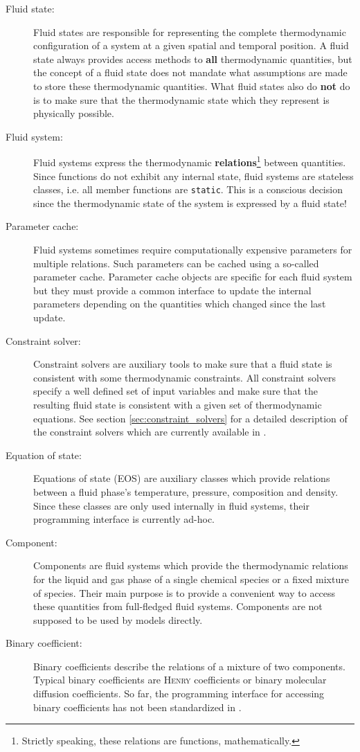 \begin{description}
\item[Fluid state:] Fluid states are responsible for representing the
  complete thermodynamic configuration of a system at a given spatial
  and temporal position. A fluid state always provides access methods
  to {\bf all} thermodynamic quantities, but the concept of a fluid state does not
  mandate what assumptions are made to store these thermodynamic
  quantities. What fluid states also do {\bf not} do is to make sure
  that the thermodynamic state which they represent is physically
  possible.
\item[Fluid system:] Fluid systems express the thermodynamic {\bf
    relations}\footnote{Strictly speaking, these relations are
    functions, mathematically.} between quantities. Since functions do
  not exhibit any internal state, fluid systems are stateless classes,
  i.e. all member functions are \texttt{static}. This is a conscious
  decision since the thermodynamic state of the system is expressed by
  a fluid state!
\item[Parameter cache:] Fluid systems sometimes require
  computationally expensive parameters for multiple relations. Such
  parameters can be cached using a so-called parameter
  cache. Parameter cache objects are specific for each fluid system
  but they must provide a common interface to update the internal
  parameters depending on the quantities which changed since the last
  update.
\item[Constraint solver:] Constraint solvers are auxiliary tools to
  make sure that a fluid state is consistent with some thermodynamic
  constraints. All constraint solvers specify a well defined set of
  input variables and make sure that the resulting fluid state is
  consistent with a given set of thermodynamic equations. See section
  \ref{sec:constraint_solvers} for a detailed description of the
  constraint solvers which are currently available in \eWoms.
\item[Equation of state:] Equations of state (EOS) are auxiliary
  classes which provide relations between a fluid phase's temperature,
  pressure, composition and density. Since these classes are only used
  internally in fluid systems, their programming interface is
  currently ad-hoc.
\item[Component:] Components are fluid systems which provide the
  thermodynamic relations for the liquid and gas phase of a single
  chemical species or a fixed mixture of species. Their main purpose
  is to provide a convenient way to access these quantities from
  full-fledged fluid systems. Components are not supposed to be used
  by models directly.
\item[Binary coefficient:] Binary coefficients describe the relations
  of a mixture of two components. Typical binary coefficients are
  \textsc{Henry} coefficients or binary molecular diffusion
  coefficients. So far, the programming interface for accessing binary
  coefficients has not been standardized in \eWoms.
\end{description}

